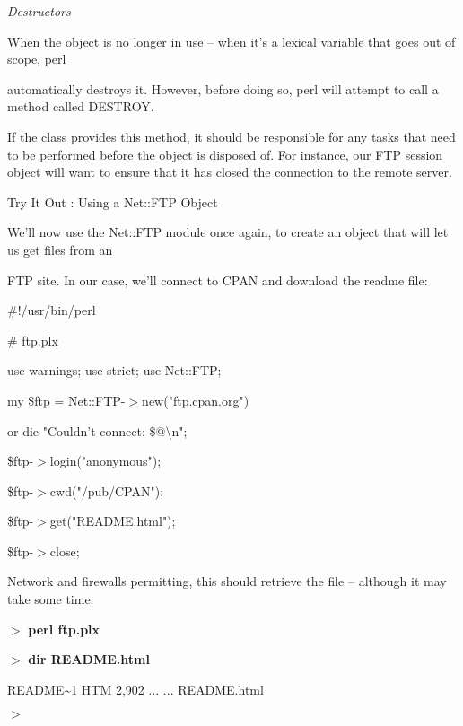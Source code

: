\documentclass[a4paper,11pt]{book}
\begin{document}
\noindent 

\noindent \textit{Destructors}

\noindent When the object is no longer in use -- when it's a lexical variable that goes out of scope, perl

\noindent automatically destroys it. However, before doing so, perl will attempt to call a method called DESTROY.

\noindent If the class provides this method, it should be responsible for any tasks that need to be performed before the object is disposed of. For instance, our FTP session object will want to ensure that it has closed the connection to the remote server.

\noindent 

\noindent Try It Out : Using a Net::FTP Object

\noindent We'll now use the Net::FTP module once again, to create an object that will let us get files from an

\noindent FTP site. In our case, we'll connect to CPAN and download the readme file:

\noindent 

\noindent \#!/usr/bin/perl

\noindent \# ftp.plx

\noindent use warnings; use strict; use Net::FTP;

\noindent 

\noindent 

\noindent my \$ftp = Net::FTP-$>$new("ftp.cpan.org")

\noindent or die "Couldn't connect: \$@\textbackslash n";

\noindent \$ftp-$>$login("anonymous");

\noindent \$ftp-$>$cwd("/pub/CPAN");

\noindent \$ftp-$>$get("README.html");

\noindent \$ftp-$>$close;

\noindent 

\noindent Network and firewalls permitting, this should retrieve the file -- although it may take some time:

\noindent 

\noindent $>$ \textbf{perl ftp.plx}

\noindent $>$ \textbf{dir README.html}

\noindent README\~{}1 HTM 2,902 ... ... README.html

\noindent $>$

\noindent 
\end{document}
